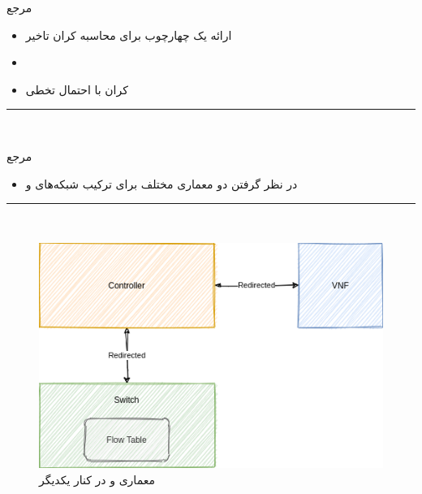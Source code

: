 \documentclass[dvipsnames]{beamer}
\makeatletter
\newcommand{\RTList}{\raggedleft\rightskip\@totalleftmargin}
\makeatother
\begin{document}
\begin{persian}
	\begin{frame}{مرجع~\cite{Miao2019}}
		\begin{itemize}\RTList{}
				\justifying%
				\item ارائه یک چهارچوب برای محاسبه کران تاخیر
				\item {}
				\item کران با احتمال تخطی
		\end{itemize}
		\begin{latin}
		\noindent\rule{1cm}{0.4pt}\\
		\scriptsize{}
		\end{latin}
	\end{frame}

	\begin{frame}{مرجع~\cite{Fahmin2017}}
		\begin{itemize}\RTList{}
				\justifying%
				\item در نظر گرفتن دو معماری مختلف برای ترکیب شبکه‌های  و 
				\begin{itemize}\end{itemize}
		\end{itemize}
		\begin{latin}
		\noindent\rule{1cm}{0.4pt}\\
		\scriptsize{}
		\end{latin}
	\end{frame}

	\begin{frame}{}
		\begin{center}\begin{figure}
			\includegraphics[scale=0.4]{images/fahmin2017-1.png}
			\caption{معماری  و   در کنار یکدیگر}
		\end{figure}\end{center}
	\end{frame}


\end{persian}
\end{document}
